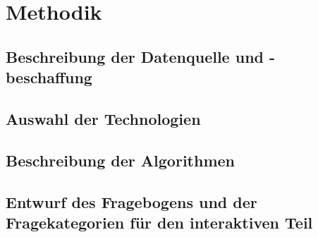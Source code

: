 \section{Methodik}

\subsection{Beschreibung der Datenquelle und -beschaffung}

\subsection{Auswahl der Technologien}

\subsection{Beschreibung der Algorithmen}

\subsection{Entwurf des Fragebogens und der Fragekategorien für den interaktiven Teil}